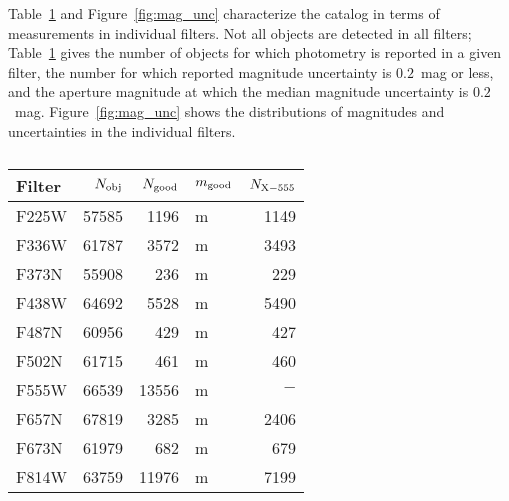 Table~\ref{tab:cat_numbers} and Figure~\ref{fig:mag_unc} characterize the catalog in terms of measurements in individual filters.
Not all objects are detected in all filters;
Table~\ref{tab:cat_numbers} gives the number of objects for which photometry is reported in a given filter,
the number for which reported magnitude uncertainty is $0.2$~mag or less,
and the aperture magnitude at which the median magnitude uncertainty is $0.2$~mag. 
Figure~\ref{fig:mag_unc} shows the distributions of magnitudes and uncertainties in the individual filters.

\begin{table}
\centering
\caption{
\label{tab:cat_numbers}}
\begin{tabular}{lrrlr}
\hline\hline
Filter & $N_{\rm obj}$ & $N_{\rm good}$ & $m_{\rm good}$ & $N_{\rm X-555}$\\
\hline
F225W &  57585 & 1196 & m & 1149\\
F336W &  61787 & 3572 & m & 3493\\
F373N &  55908 & 236 & m & 229\\
F438W &  64692 & 5528 & m & 5490\\
F487N &  60956 & 429 & m & 427\\
F502N &  61715 & 461 & m & 460\\
F555W &  66539 & 13556 & m & $-$\\
F657N &  67819 & 3285 & m & 2406\\
F673N &  61979 & 682 & m & 679\\
F814W &  63759 & 11976 & m & 7199\\
\hline
\end{tabular}
\end{table}

\begin{figure*}
\centering
\caption{Distribution of magnitudes and uncertainties for objects in the \citet{chandar10} M83 ERS catalog.}
\label{fig:mag_unc}
\end{figure*}

